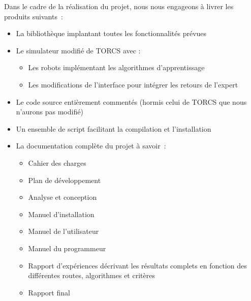 \documentclass[a4paper,12pt]{article}
\begin{document}
  Dans le cadre de la réalisation du projet, nous nous engageons à livrer les produits suivants : 
  \begin{itemize}
   \item La bibliothèque implantant toutes les fonctionnalités prévues
   \item Le simulateur modifié de TORCS avec :
    \begin{itemize}
     \item Les robots implémentant les algorithmes d'apprentissage
     \item Les modifications de l'interface pour intégrer les retours de l'expert 
    \end{itemize}
   \item Le code source entièrement commentés (hormis celui de TORCS que nous n'aurons pas modifié)
   \item Un ensemble de script facilitant la compilation et l'installation
   \item La documentation complète du projet à savoir :
    \begin{itemize}
      \item Cahier des charges
      \item Plan de développement
      \item Analyse et conception
      \item Manuel d’installation
      \item Manuel de l’utilisateur
      \item Manuel du programmeur
      \item Rapport d'expériences décrivant les résultats complets en fonction des différentes routes, algorithmes et critères
      \item Rapport final
    \end{itemize}
  \end{itemize}
  
  
  
\newpage
{}


\end{document}
